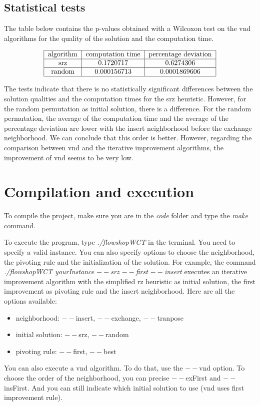 \documentclass{article}
\begin{document}
\subsection{Statistical tests}

The table below contains the p-values obtained with a Wilcoxon test on the vnd algorithms for the quality of the solution and the computation time.

\begin{align*}
\begin{tabular}{|c|c|c|} \hline
    algorithm & computation time & percentage deviation \\ \hline
    srz & 0.1720717 & 0.6274306 \\ \hline
    random & 0.000156713 & 0.0001869606 \\ \hline
\end{tabular}
\end{align*}

The tests indicate that there is no statistically significant differences between the solution qualities and the computation times for the srz heuristic.
However, for the random permutation as initial solution, there is a difference.
For the random permutation, the average of the computation time and the average of the percentage deviation are lower with the insert neighborhood before the exchange neighborhood.
We can conclude that this order is better.
However, regarding the comparison between vnd and the iterative improvement algorithms, the improvement of vnd seems to be very low. 

\section{Compilation and execution}

To compile the project, make sure you are in the \textit{code} folder and type the \textit{make} command. \newline

To execute the program, type \textit{./flowshopWCT} in the terminal. You need to specify a valid instance.
You can also specify options to choose the neighborhood, the pivoting rule and the initialization of the solution.
For example, the command \textit{./flowshopWCT yourInstance $--$srz $--$first $--$insert} executes an iterative improvement algorithm with the simplified rz heuristic as initial solution, the first improvement as pivoting rule and the insert neighborhood. Here are all the options available: \newline

\begin{itemize}
    \item neighborhood: $--$insert, $--$exchange, $--$tranpose
    \item initial solution: $--$srz, $--$random
    \item pivoting rule: $--$first, $--$best
\end{itemize}

You can also execute a vnd algorithm. To do that, use the $--$vnd option. To choose the order of the neighborhood, you can precise $--$exFirst and $--$insFirst. And you can still indicate which initial solution to use (vnd uses first improvement rule).
\end{document}
